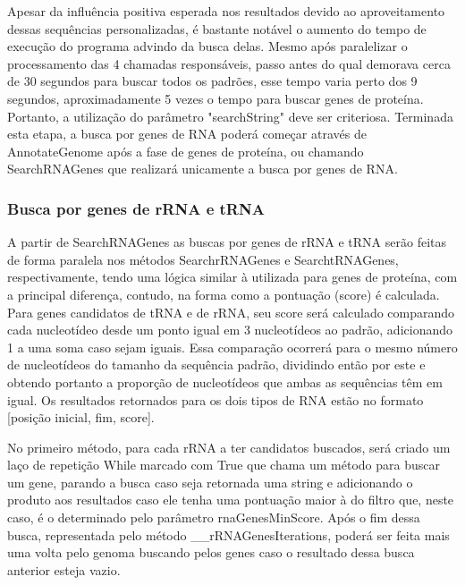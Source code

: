 \documentclass[brazilian,12pt,a4paper,final]{article}
\begin{document}
\vspace{0.5cm}

Apesar da influência positiva esperada nos resultados devido ao aproveitamento dessas sequências personalizadas, é bastante notável o aumento do tempo de execução do programa advindo da busca delas. Mesmo após paralelizar o processamento das 4 chamadas responsáveis, passo antes do qual demorava cerca de 30 segundos para buscar todos os padrões, esse tempo varia perto dos 9 segundos, aproximadamente 5 vezes o tempo para buscar genes de proteína. Portanto, a utilização do parâmetro "searchString" deve ser criteriosa. Terminada esta etapa, a busca por genes de RNA poderá começar através de AnnotateGenome após a fase de genes de proteína, ou chamando SearchRNAGenes que realizará unicamente a busca por genes de RNA.

\vspace{0.5cm}

\subsubsection{Busca por genes de rRNA e tRNA}
\vspace{0.5cm}

A partir de SearchRNAGenes as buscas por genes de rRNA e tRNA serão feitas de forma paralela nos métodos SearchrRNAGenes e SearchtRNAGenes, respectivamente,  tendo uma lógica similar à utilizada para genes de proteína, com a principal diferença, contudo, na forma como a pontuação (score) é calculada. Para genes candidatos de tRNA e de rRNA, seu score será calculado comparando cada nucleotídeo desde um ponto igual em 3 nucleotídeos ao padrão, adicionando 1 a uma soma caso sejam iguais. Essa comparação ocorrerá para o mesmo número de nucleotídeos do tamanho da sequência padrão, dividindo então por este e obtendo portanto a proporção de nucleotídeos que ambas as sequências têm em igual. Os resultados retornados para os dois tipos de RNA estão no formato [posição inicial, fim, score].

\vspace{0.5cm}


No primeiro método, para cada rRNA a ter candidatos buscados, será criado um laço de repetição While marcado com True que chama um método para buscar um gene, parando a busca caso seja retornada uma string e adicionando o produto aos resultados caso ele tenha uma pontuação maior à do filtro que, neste caso, é o determinado pelo parâmetro rnaGenesMinScore. Após o fim dessa busca, representada pelo método \_\_rRNAGenesIterations, poderá ser feita mais uma volta pelo genoma buscando pelos genes caso o resultado dessa busca anterior esteja vazio.
\end{document}
